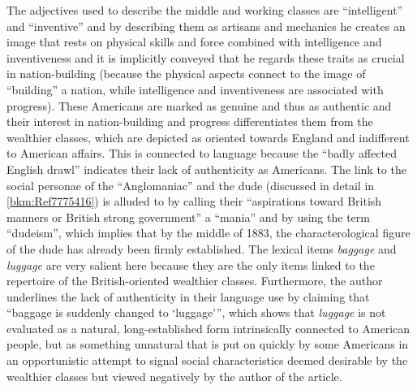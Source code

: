 The adjectives used to describe the middle and working classes are “intelligent” and “inventive” and by describing them as artisans and mechanics he creates an image that rests on physical skills and force combined with intelligence and inventiveness and it is implicitly conveyed that he regards these traits as crucial in nation-building (because the physical aspects connect to the image of “building” a nation, while intelligence and inventiveness are associated with progress). These Americans are marked as genuine and thus as authentic and their interest in nation-building and progress differentiates them from the wealthier classes, which are depicted as oriented towards England and indifferent to American affairs. This is connected to language because the “badly affected English drawl” indicates their lack of authenticity as Americans. The link to the social personae of the “Anglomaniac” and the dude (discussed in detail in \ref{bkm:Ref7775416}) is alluded to by calling their “aspirations toward British manners or British strong government” a “mania” and by using the term “dudeism”, which implies that by the middle of 1883, the characterological figure of the dude has already been firmly established. The lexical items \emph{baggage} and \emph{luggage} are very salient here because they are the only items linked to the repertoire of the British-oriented wealthier classes. Furthermore, the author underlines the lack of authenticity in their language use by claiming that “baggage is suddenly changed to ‘luggage’”, which shows that \emph{luggage} is not evaluated as a natural, long-established form intrinsically connected to American people, but as something unnatural that is put on quickly by some Americans in an opportunistic attempt to signal social characteristics deemed desirable by the wealthier classes but viewed negatively by the author of the article.


